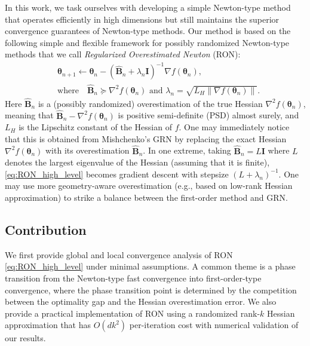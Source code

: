 \documentclass[11pt]{amsart}
\theoremstyle{plain}
\theoremstyle{definition}
\theoremstyle{remark}
\def\H{\mathbf{H}}
\def\I{\mathbf{I}}
\def\B{\mathbf{B}}
\def\param{\boldsymbol{\theta}}
\def\I{\mathbf{I}}
\begin{document}
In this work, we task ourselves with developing a simple Newton-type method that operates efficiently in high dimensions but still maintains the superior convergence guarantees of Newton-type methods. Our method is based on the following simple and flexible framework for possibly randomized Newton-type methods that we call \textit{Regularized Overestimated Newton} (RON):
\begin{align}\label{eq:RON_high_level}
& \param_{n+1}\xleftarrow[]{}\param_{n} - ( \hat{\B}_{n} + \lambda_{n} \I )^{-1}  \nabla f(\param_{n}),\\
 &\text{where} \quad  \hat{\B}_{n}  \succeq \nabla^{2}f(\param_{n})\text{ and } \lambda_{n}=\sqrt{L_H\| \nabla f(\param_{n})\|}\nonumber.
\end{align}
Here $\hat{\B}_{n}$ is a (possibly randomized) overestimation of the true Hessian $\nabla^{2} f(\param_{n})$, meaning that $\hat{\B}_{n}-\nabla^{2} f(\param_{n})$ is positive semi-definite (PSD) almost surely, and $L_H$ is the Lipschitz constant of the Hessian of $f$. One may immediately notice that this is obtained from Mishchenko's GRN \cite{mishchenko2023regularized} by replacing the exact Hessian $\nabla^{2} f(\param_{n})$ with its overestimation $\hat{\B}_{n}$. In one extreme, taking $\hat{\B}_{n}= L \I $ where $L$ denotes the largest eigenvalue of the Hessian (assuming that it is finite), \eqref{eq:RON_high_level} becomes gradient descent with stepsize $(L+\lambda_{n})^{-1}$. One may use more geometry-aware overestimation (e.g., based on low-rank Hessian approximation) to strike a balance between the first-order method and GRN. 

\subsection{Contribution} 

We first provide global and local convergence analysis of RON \eqref{eq:RON_high_level} under minimal assumptions. A common theme is a phase transition from the Newton-type fast convergence into first-order-type convergence, where the phase transition point is determined by the competition between the optimality gap and the Hessian overestimation error. We also provide a practical implementation of RON using a randomized rank-$k$ Hessian approximation that has $O(dk^{2})$ per-iteration cost with numerical validation of our results. 
\end{document}
